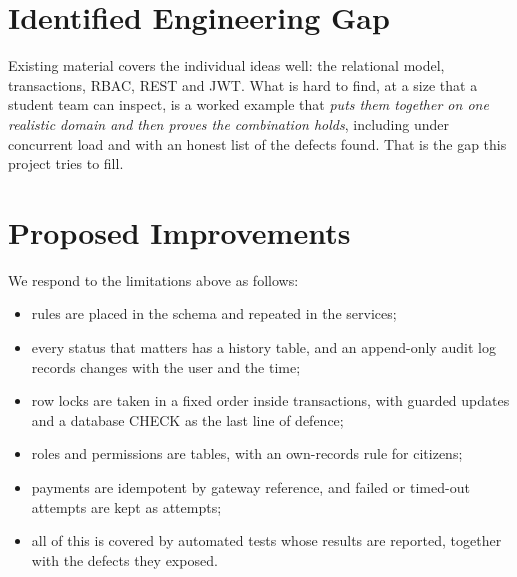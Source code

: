 \section{Identified Engineering Gap}
Existing material covers the individual ideas well: the relational model, transactions,
RBAC, REST and JWT. What is hard to find, at a size that a student team can inspect, is
a worked example that \emph{puts them together on one realistic domain and then proves
the combination holds}, including under concurrent load and with an honest list of the
defects found. That is the gap this project tries to fill.

\section{Proposed Improvements}
We respond to the limitations above as follows:
\begin{itemize}
\item rules are placed in the schema and repeated in the services;
\item every status that matters has a history table, and an append-only audit log records changes with the user and the time;
\item row locks are taken in a fixed order inside transactions, with guarded updates and a database CHECK as the last line of defence;
\item roles and permissions are tables, with an own-records rule for citizens;
\item payments are idempotent by gateway reference, and failed or timed-out attempts are kept as attempts;
\item all of this is covered by automated tests whose results are reported, together with the defects they exposed.
\end{itemize}
